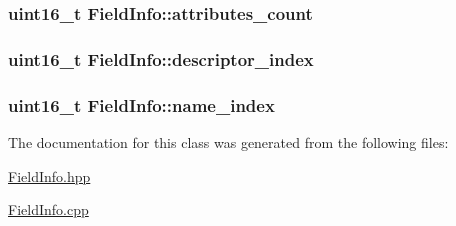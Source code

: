 \subsubsection[{\texorpdfstring{attributes\+\_\+count}{attributes_count}}]{\setlength{\rightskip}{0pt plus 5cm}uint16\+\_\+t Field\+Info\+::attributes\+\_\+count}\hypertarget{class_field_info_ae559a93403a28923c24eaaeabfcc63c8}{}\label{class_field_info_ae559a93403a28923c24eaaeabfcc63c8}
\subsubsection[{\texorpdfstring{descriptor\+\_\+index}{descriptor_index}}]{\setlength{\rightskip}{0pt plus 5cm}uint16\+\_\+t Field\+Info\+::descriptor\+\_\+index}\hypertarget{class_field_info_aff3935ae95047693cbe029db915944b9}{}\label{class_field_info_aff3935ae95047693cbe029db915944b9}
\subsubsection[{\texorpdfstring{name\+\_\+index}{name_index}}]{\setlength{\rightskip}{0pt plus 5cm}uint16\+\_\+t Field\+Info\+::name\+\_\+index}\hypertarget{class_field_info_a97fd269599826fe99f61ae83311a909c}{}\label{class_field_info_a97fd269599826fe99f61ae83311a909c}


The documentation for this class was generated from the following files\+:\begin{DoxyCompactItemize}
\item 
\hyperlink{_field_info_8hpp}{Field\+Info.\+hpp}\item 
\hyperlink{_field_info_8cpp}{Field\+Info.\+cpp}\end{DoxyCompactItemize}
